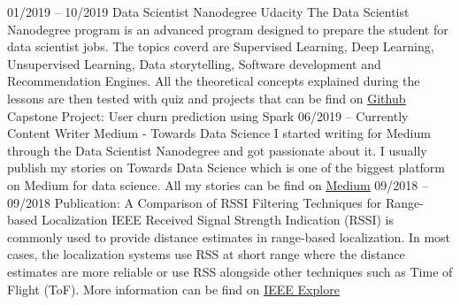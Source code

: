 \documentclass[9pt]{developercv} %
\begin{document}
\begin{entrylist}
	\entry
		{01/2019 -- 10/2019}
		{Data Scientist Nanodegree}
		{Udacity}
		{The Data Scientist Nanodegree program is an advanced program designed to prepare the student for data scientist jobs. The topics coverd are Supervised Learning, Deep Learning, Unsupervised Learning, Data storytelling, Software development and Recommendation Engines. All the theoretical concepts explained during the lessons are then tested with quiz and projects that can be find on \underline{\href{https://github.com/simonerigoni/udacity/tree/master/data_scientist_nanodegree}{Github}}}
		{}
		{Capstone Project: User churn prediction using Spark}
	\entry
		{06/2019 -- Currently}
		{Content Writer}
		{Medium -  Towards Data Science}
		{I started writing for Medium through the Data Scientist Nanodegree and got passionate about it. I usually publish my stories on Towards Data Science which is one of the biggest platform on Medium for data science. All my stories can be find on \underline{\href{https://medium.com/@simone.rigoni01}{Medium}}}
		{}
		{}
	\entry
		{09/2018 -- 09/2018}
		{Publication: A Comparison of RSSI Filtering Techniques for Range-based Localization}
		{IEEE}
		{Received Signal Strength Indication (RSSI) is commonly used to provide distance estimates in range-based localization. In most cases, the localization systems use RSS at short range where the distance estimates are more reliable or use RSS alongside other techniques such as Time of Flight (ToF). More information can be find on \underline{\href{https://ieeexplore.ieee.org/abstract/document/8502556}{IEEE Explore}}}
		{}
		{}

\end{entrylist}
\end{document}

